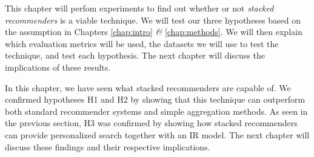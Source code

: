 \label{chap:results}

This chapter will perfom experiments to find out whether or not
\emph{stacked recommenders} is a viable technique.
We will test our three hypotheses based on the assumption in Chapters 
\ref{chap:intro} \emph{\&} \ref{chap:methods}.
We will then explain which evaluation metrics will be used,
the datasets we will use to test the technique,
and test each hypothesis.
The next chapter will discuss the implications of these results.







\hr

\noindent
In this chapter, we have seen what stacked recommenders are capable of.
We confirmed hypotheses H1 and H2 by showing that this technique
can outperform both standard recommender systems and 
simple aggregation methods. As seen in the previous section,
H3 was confirmed by showing how stacked recommenders can provide
personalized search together with an IR model.
The next chapter will discuss these findings and their respective implications.

